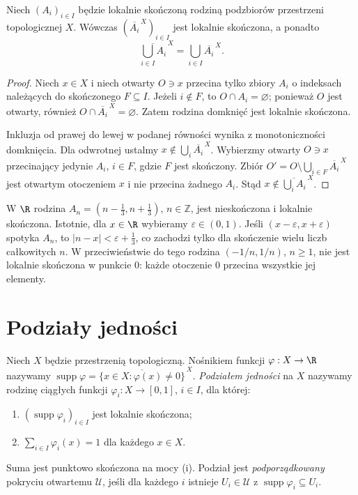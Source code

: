 \begin{stwierdzenie}
\label{prop:topog-parazwartosc-domkniecia}
Niech $(A_i)_{i\in I}$ będzie lokalnie skończoną
rodziną podzbiorów przestrzeni topologicznej $X$.
Wówczas $(\overline{A_i}^{\,X})_{i\in I}$
jest lokalnie skończona, a ponadto
\[
\overline{\bigcup_{i\in I} A_i}^{\,X}
 =\bigcup_{i\in I}\overline{A_i}^{\,X}.
\]
\end{stwierdzenie}
\begin{proof}
Niech $x\in X$ i niech otwarty $O\ni x$
przecina tylko zbiory $A_i$ o indeksach
należących do skończonego $F\subseteq I$.
Jeżeli $i\notin F$, to $O\cap A_i=\varnothing$;
ponieważ $O$ jest otwarty, również
$O\cap\overline{A_i}^{\,X}=\varnothing$.
Zatem rodzina domknięć jest lokalnie skończona.

Inkluzja od prawej do lewej w podanej
równości wynika z monotoniczności domknięcia.
Dla odwrotnej ustalmy
$x\notin\bigcup_i\overline{A_i}^{\,X}$.
Wybierzmy otwarty $O\ni x$ przecinający
jedynie $A_i$, $i\in F$, gdzie $F$ jest
skończony. Zbiór
$O'=O\setminus\bigcup_{i\in F}
\overline{A_i}^{\,X}$
jest otwartym otoczeniem $x$ i nie
przecina żadnego $A_i$.
Stąd $x\notin\overline{\bigcup_i A_i}^{\,X}$.
\end{proof}

\begin{przyklad}
\label{ex:topog-parazwartosc-przedzialy}
W $\R$ rodzina
$A_n=(n-\frac13,n+\frac13)$,
$n\in\mathbb Z$, jest nieskończona
i lokalnie skończona.
Istotnie, dla $x\in\R$ wybieramy
$\varepsilon\in(0,1)$.
Jeśli $(x-\varepsilon,x+\varepsilon)$
spotyka $A_n$, to
$|n-x|<\varepsilon+\frac13$,
co zachodzi tylko dla skończenie
wielu liczb całkowitych $n$.
W przeciwieństwie do tego rodzina
$(-1/n,1/n)$, $n\ge1$, nie jest
lokalnie skończona w punkcie $0$:
każde otoczenie $0$ przecina
wszystkie jej elementy.
\end{przyklad}

\section{Podziały jedności}
\label{sec:topog-parazwartosc-jednosc}

\begin{definicja}
\label{def:topog-parazwartosc-podzial}
Niech $X$ będzie przestrzenią topologiczną.
Nośnikiem funkcji $\varphi:X\to\R$ nazywamy
$\operatorname{supp}\varphi
=\overline{\{x\in X:\varphi(x)\ne0\}}^{\,X}$.
\emph{Podziałem jedności} na $X$ nazywamy
rodzinę ciągłych funkcji
$\varphi_i:X\to[0,1]$, $i\in I$, dla której:
\begin{enumerate}[label=(\roman*)]
\item $(\operatorname{supp}\varphi_i)_{i\in I}$
      jest lokalnie skończona;
\item $\sum_{i\in I}\varphi_i(x)=1$
      dla każdego $x\in X$.
\end{enumerate}
Suma jest punktowo skończona na mocy (i).
Podział jest \emph{podporządkowany}
pokryciu otwartemu $\mathcal U$,
jeśli dla każdego $i$ istnieje
$U_i\in\mathcal U$ z
$\operatorname{supp}\varphi_i\subseteq U_i$.
\end{definicja}

